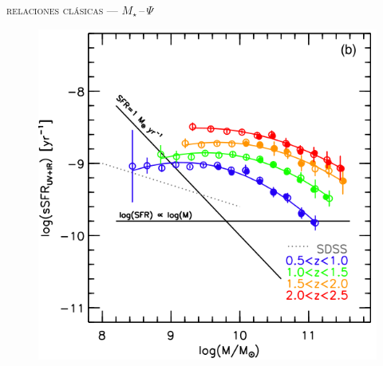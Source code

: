 \documentclass[xcolor=dvipsnames,4pt,hyperref={colorlinks,citecolor=black,linkcolor=black,urlcolor=black}]{beamer}
\begin{document}
\begin{frame}{\textsc{relaciones clásicas --- $M_\star\,$--$\,\Psi$}}

\begin{figure}
\includegraphics[scale=1]{img/whitaker2014-2}
\end{figure}
\end{frame}
\end{document}
